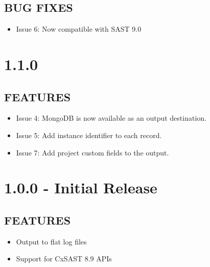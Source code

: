 \subsection*{BUG FIXES}
    \begin{itemize}
        \item Issue 6: Now compatible with SAST 9.0
    \end{itemize}

\section{1.1.0}
\subsection*{FEATURES}
    \begin{itemize}
        \item Issue 4: MongoDB is now available as an output destination.
        \item Issue 5: Add instance identifier to each record.
        \item Issue 7: Add project custom fields to the output.
    \end{itemize}

\section{1.0.0 - Initial Release}
\subsection*{FEATURES}
    \begin{itemize}
        \item Output to flat log files
        \item Support for CxSAST 8.9 APIs
    \end{itemize}
